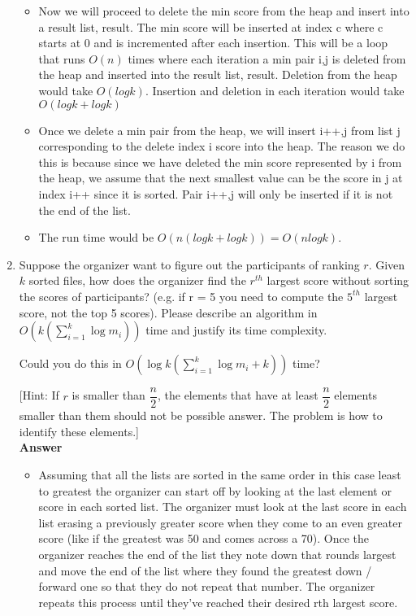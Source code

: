 \documentclass{article}
\begin{document}
\begin{enumerate}
\begin{itemize}
\item Now we will proceed to delete the min score from the heap and insert into a result list, result. The min score will be inserted at index c where c starts at 0 and is incremented after each insertion. This will be a loop that runs $O(n)$ times where each iteration a min pair i,j is deleted from the heap and inserted into the result list, result. Deletion from the heap would take $O(logk)$. Insertion and deletion in each iteration would take $O(logk+logk)$

\item Once we delete a min pair from the heap, we will insert i++,j from list j corresponding to the delete index i score into the heap. The reason we do this is because since we have deleted the min score represented by i from the heap, we assume that the next smallest value can be the score in j at index i++ since it is sorted. Pair i++,j will only be inserted if it is not the end of the list.

\item The run time would be $O(n(logk+logk) ) = O(nlogk)$.
\end{itemize}

\item Suppose the organizer want to figure out the participants of
  ranking $r$. Given $k$ sorted files, how does the organizer find the
  $r^{th}$ largest score without sorting the scores of participants?
  (e.g. if r = 5 you need to compute the $5^{th}$ largest score, not 
  the top 5 scores). Please describe an algorithm in $O(k(\sum_{i=1}^{k}\log m_{i}))$ 
  time and justify its time complexity. 

Could you do this in $O(\log k (\sum_{i=1}^{k}\log m_{i} + k))$ time? 

  [Hint: If $r$ is smaller than $\dfrac{n}{2}$, the elements that have at least $\dfrac{n}{2}$ 
  elements smaller than them should not be possible answer. The problem is how to identify these
  elements.]\\
  
\textbf{ Answer }
\begin{itemize}
\item Assuming that all the lists are sorted in the same order in this case least to greatest the organizer can start off by looking at the last element or score in each sorted list. The organizer must look at the last score in each list erasing a previously greater score when they come to an even greater score (like if the greatest was 50 and comes across a 70). Once the organizer reaches the end of the list they note down that rounds largest and move the end of the list where they found the greatest down / forward one so that they do not repeat that number. The organizer repeats this process until they've reached their desired rth largest score.


\end{itemize}
\end{enumerate}
\end{document}
